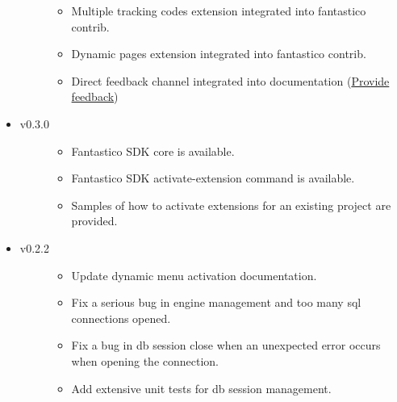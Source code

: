 \documentclass[letterpaper,10pt,english]{sphinxmanual}
\begin{document}
\begin{itemize}
\begin{description}
\begin{itemize}
\item {} 
Multiple tracking codes extension integrated into fantastico contrib.

\item {} 
Dynamic pages extension integrated into fantastico contrib.

\item {} 
Direct feedback channel integrated into documentation (\href{https://docs.google.com/forms/d/1tKBopU3lfDB\_w8F4h7Rl1Rn4uydAJq-nha09L\_ptJck/edit?usp=sharing}{Provide feedback})

\end{itemize}

\end{description}

\item {} \begin{description}
\item[{v0.3.0}] \leavevmode\begin{itemize}
\item {} 
Fantastico SDK core is available.

\item {} 
Fantastico SDK activate-extension command is available.

\item {} 
Samples of how to activate extensions for an existing project are provided.

\end{itemize}

\end{description}

\item {} \begin{description}
\item[{v0.2.2}] \leavevmode\begin{itemize}
\item {} 
Update dynamic menu activation documentation.

\item {} 
Fix a serious bug in engine management and too many sql connections opened.

\item {} 
Fix a bug in db session close when an unexpected error occurs when opening the connection.

\item {} 
Add extensive unit tests for db session management.

\end{itemize}

\end{description}


\end{itemize}
\end{document}
